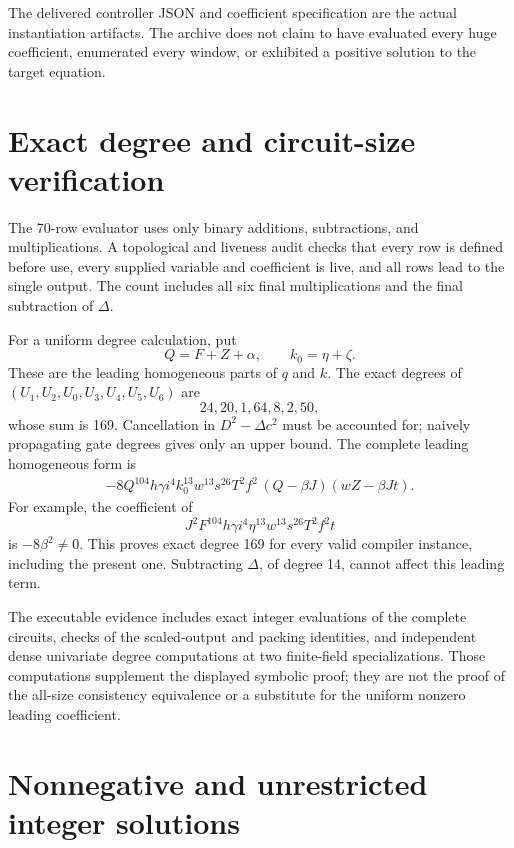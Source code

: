 \documentclass[11pt]{article}
\theoremstyle{definition}
\begin{document}
The delivered controller JSON and coefficient specification are the actual
instantiation artifacts. The archive does not claim to have evaluated every
huge coefficient, enumerated every window, or exhibited a positive solution
to the target equation.

\section{Exact degree and circuit-size verification}

The 70-row evaluator uses only binary additions, subtractions, and
multiplications. A topological and liveness audit checks that every row is
defined before use, every supplied variable and coefficient is live, and
all rows lead to the single output. The count includes all six final
multiplications and the final subtraction of $\Delta$.

For a uniform degree calculation, put
\[
 Q=F+Z+\alpha,\qquad k_0=\eta+\zeta.
\]
These are the leading homogeneous parts of $q$ and $k$.
The exact degrees of $(U_1,U_2,U_0,U_3,U_4,U_5,U_6)$ are
\[
 24,20,1,64,8,2,50,
\]
whose sum is 169. Cancellation in $D^2-\Delta c^2$ must be accounted for;
naively propagating gate degrees gives only an upper bound.
The complete leading homogeneous form is
\begin{equation}\label{eq:leader}
\begin{split}
 -8Q^{104}h\gamma i^4 k_0^{13}w^{13}s^{26}T^2f^2
 \,(Q-\beta J)(wZ-\beta Jt).
\end{split}
\end{equation}
For example, the coefficient of
\[
 J^2F^{104}h\gamma i^4\eta^{13}w^{13}s^{26}T^2f^2t
\]
is $-8\beta^2\ne0$. This proves exact degree 169 for every valid compiler
instance, including the present one. Subtracting $\Delta$, of degree 14,
cannot affect this leading term.

The executable evidence includes exact integer evaluations of the complete
circuits, checks of the scaled-output and packing identities, and independent
dense univariate degree computations at two finite-field specializations.
Those computations supplement the displayed symbolic proof; they are not
the proof of the all-size consistency equivalence or a substitute for the
uniform nonzero leading coefficient.

\section{Nonnegative and unrestricted integer solutions}
\label{sec:domains}
\end{document}
